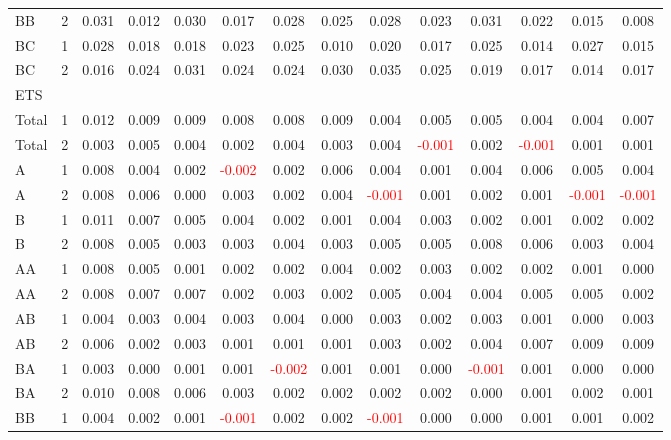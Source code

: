 \begin{table}[H]
{\begin{tabular}{llcccccccccccc}
BB & 2 & 0.031 & 0.012 & 0.030 & 0.017 & 0.028 & 0.025 & 0.028 & 0.023 & 0.031 & 0.022 & 0.015 & 0.008\\
BC & 1 & 0.028 & 0.018 & 0.018 & 0.023 & 0.025 & 0.010 & 0.020 & 0.017 & 0.025 & 0.014 & 0.027 & 0.015\\
BC & 2 & 0.016 & 0.024 & 0.031 & 0.024 & 0.024 & 0.030 & 0.035 & 0.025 & 0.019 & 0.017 & 0.014 & 0.017\\
\hline
ETS &  &  &  &  &  &  &  &  &  &  &  &  & \\
\hline
Total & 1 & 0.012 & 0.009 & 0.009 & 0.008 & 0.008 & 0.009 & 0.004 & 0.005 & 0.005 & 0.004 & 0.004 & 0.007\\
Total & 2 & 0.003 & 0.005 & 0.004 & 0.002 & 0.004 & 0.003 & 0.004 & \textcolor{red}{-0.001} & 0.002 & \textcolor{red}{-0.001} & 0.001 & 0.001\\
A & 1 & 0.008 & 0.004 & 0.002 & \textcolor{red}{-0.002} & 0.002 & 0.006 & 0.004 & 0.001 & 0.004 & 0.006 & 0.005 & 0.004\\
A & 2 & 0.008 & 0.006 & 0.000 & 0.003 & 0.002 & 0.004 & \textcolor{red}{-0.001} & 0.001 & 0.002 & 0.001 & \textcolor{red}{-0.001} & \textcolor{red}{-0.001}\\
B & 1 & 0.011 & 0.007 & 0.005 & 0.004 & 0.002 & 0.001 & 0.004 & 0.003 & 0.002 & 0.001 & 0.002 & 0.002\\
B & 2 & 0.008 & 0.005 & 0.003 & 0.003 & 0.004 & 0.003 & 0.005 & 0.005 & 0.008 & 0.006 & 0.003 & 0.004\\
AA & 1 & 0.008 & 0.005 & 0.001 & 0.002 & 0.002 & 0.004 & 0.002 & 0.003 & 0.002 & 0.002 & 0.001 & 0.000\\
AA & 2 & 0.008 & 0.007 & 0.007 & 0.002 & 0.003 & 0.002 & 0.005 & 0.004 & 0.004 & 0.005 & 0.005 & 0.002\\
AB & 1 & 0.004 & 0.003 & 0.004 & 0.003 & 0.004 & 0.000 & 0.003 & 0.002 & 0.003 & 0.001 & 0.000 & 0.003\\
AB & 2 & 0.006 & 0.002 & 0.003 & 0.001 & 0.001 & 0.001 & 0.003 & 0.002 & 0.004 & 0.007 & 0.009 & 0.009\\
BA & 1 & 0.003 & 0.000 & 0.001 & 0.001 & \textcolor{red}{-0.002} & 0.001 & 0.001 & 0.000 & \textcolor{red}{-0.001} & 0.001 & 0.000 & 0.000\\
BA & 2 & 0.010 & 0.008 & 0.006 & 0.003 & 0.002 & 0.002 & 0.002 & 0.002 & 0.000 & 0.001 & 0.002 & 0.001\\
BB & 1 & 0.004 & 0.002 & 0.001 & \textcolor{red}{-0.001} & 0.002 & 0.002 & \textcolor{red}{-0.001} & 0.000 & 0.000 & 0.001 & 0.001 & 0.002\\

\end{tabular}}
\end{table}
